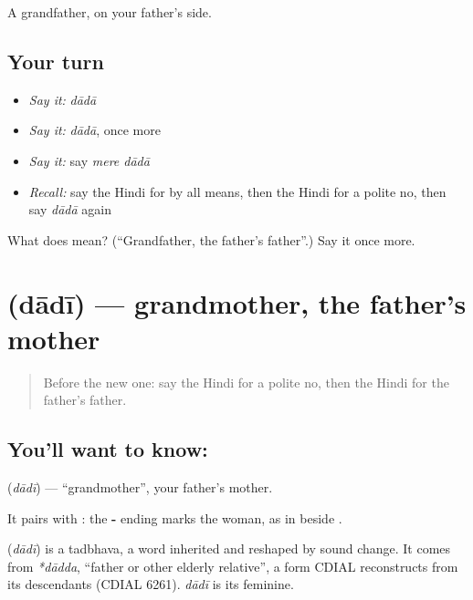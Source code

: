 \begin{grammarlens}[title={What you've built}]
A grandfather, on your father's side.
\end{grammarlens}

\subsection*{Your turn}
\begin{itemize}
\raggedright
  \item \emph{Say it:} \emph{dādā}
  \item \emph{Say it:} \emph{dādā}, once more
  \item \emph{Say it:} say \emph{mere dādā}
  \item \emph{Recall:} say the Hindi for by all means, then the Hindi for a polite no, then say \emph{dādā} again
\end{itemize}

\begin{tcolorbox}[breakable,colback=teal!4,colframe=teal!35!black,title={Before you move on}]
What does  mean? (\textquotedblleft{}Grandfather, the father's father\textquotedblright{}.) Say it once more.
\end{tcolorbox}
\section[\texorpdfstring{\hi{दादी} (dādī)}{दादी (dādī)}]{ (dādī) — grandmother, the father's mother}

\label{lesson:HI-C116-dadi}



\begin{quote}
Before the new one: say the Hindi for a polite no, then the Hindi for the father's father.
\end{quote}

\subsection*{You'll want to know: }
\textbf{} (\emph{dādī}) — \textquotedblleft{}grandmother\textquotedblright{}, your father's mother.

It pairs with \textbf{}: the \textbf{-} ending marks the woman, as in \textbf{} beside \textbf{}.

\begin{cousinweb}
\textbf{} (\emph{dādī}) is a tadbhava, a word inherited and reshaped by sound change. It comes from \emph{*dādda}, \textquotedblleft{}father or other elderly relative\textquotedblright{}, a form CDIAL reconstructs from its descendants (CDIAL 6261). \emph{dādī} is its feminine.
\end{cousinweb}

